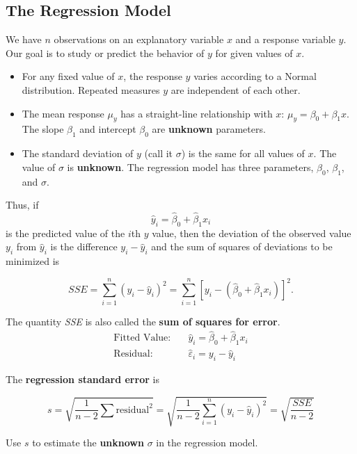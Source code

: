 \subsection*{The Regression Model}

We have $n$ observations on an explanatory variable $x$ and a response variable $y$. Our goal is to study or predict the behavior of $y$ for given values of $x$.

\begin{itemize}
  \item For any fixed value of $x$, the response $y$ varies according to a Normal distribution. Repeated measures $y$ are independent of each other.
  
  \item The mean response $\mu_y$ has a straight-line relationship with $x$:  
  $\mu_y = \beta_0 + \beta_1 x$.  
  The slope $\beta_1$ and intercept $\beta_0$ are \textbf{unknown} parameters.
  
  \item The standard deviation of $y$ (call it $\sigma$) is the same for all values of $x$.  
  The value of $\sigma$ is \textbf{unknown}.  
  The regression model has three parameters, $\beta_0$, $\beta_1$, and $\sigma$.
\end{itemize}

Thus, if
\[
\hat{y}_i = \hat{\beta}_0 + \hat{\beta}_1 x_i
\]
is the predicted value of the $i$th $y$ value, then the deviation of the observed value $y_i$ from $\hat{y}_i$ is the difference $y_i - \hat{y}_i$ and the sum of squares of deviations to be minimized is

\[
SSE = \sum_{i=1}^{n} (y_i - \hat{y}_i)^2 = \sum_{i=1}^{n} [y_i - (\hat{\beta}_0 + \hat{\beta}_1 x_i)]^2.
\]

The quantity \textit{SSE} is also called the \textbf{sum of squares for error}.
\begin{align*}
\text{Fitted Value:} \quad & \hat{y}_i = \hat{\beta}_0 + \hat{\beta}_1 x_i \\
\text{Residual:} \quad & \hat{\varepsilon}_i = y_i - \hat{y}_i
\end{align*}

The \textbf{regression standard error} is

\[
s = \sqrt{\frac{1}{n - 2} \sum \text{residual}^2} 
= \sqrt{\frac{1}{n - 2} \sum_{i=1}^{n} (y_i - \hat{y}_i)^2} 
= \sqrt{\frac{SSE}{n - 2}}
\]

Use $s$ to estimate the \textbf{unknown} $\sigma$ in the regression model.\\

